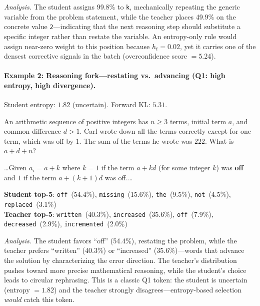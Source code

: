 \documentclass{article}
\begin{document}
\noindent\textit{Analysis.}
The student assigns 99.8\% to \texttt{k}, mechanically repeating the generic variable from the problem statement, while the teacher places 49.9\% on the concrete value \texttt{2}---indicating that the next reasoning step should substitute a specific integer rather than restate the variable.
An entropy-only rule would assign near-zero weight to this position because $h_t = 0.02$, yet it carries one of the densest corrective signals in the batch (overconfidence score $= 5.24$).

\paragraph{Example 2: Reasoning fork---restating vs.\ advancing (\textbf{Q1}: high entropy, high divergence).}
Student entropy: $1.82$ (uncertain). Forward KL: $5.31$.

\begin{tcolorbox}[colback=gray!5, colframe=black, boxrule=0.5pt, title={Problem}]
An arithmetic sequence of positive integers has $n \ge 3$ terms, initial term $a$, and common difference $d > 1$. Carl wrote down all the terms correctly except for one term, which was off by $1$. The sum of the terms he wrote was $222$. What is $a + d + n$?
\end{tcolorbox}

\begin{tcolorbox}[colback=blue!3, colframe=black, boxrule=0.5pt, title={Student response (excerpt)}]
\small
\ldots Given $a_i = a + k$ where $k = 1$ if the term $a + kd$ (for some integer $k$) was \colorbox{red!20}{\textbf{off}} and $1$ if the term $a + (k+1)d$ was off.\ldots
\end{tcolorbox}

\begin{tcolorbox}[colback=yellow!5, colframe=black, boxrule=0.5pt, title={Token distributions}]
\small
\textbf{Student top-5}: \texttt{off}~(54.4\%), \texttt{missing}~(15.6\%), \texttt{the}~(9.5\%), \texttt{not}~(4.5\%), \texttt{replaced}~(3.1\%) \\
\textbf{Teacher top-5}: \texttt{written}~(40.3\%), \texttt{increased}~(35.6\%), \texttt{off}~(7.9\%), \texttt{decreased}~(2.9\%), \texttt{incremented}~(2.0\%)
\end{tcolorbox}

\noindent\textit{Analysis.}
The student favors ``off'' (54.4\%), restating the problem, while the teacher prefers ``written'' (40.3\%) or ``increased'' (35.6\%)---words that advance the solution by characterizing the error direction.
The teacher's distribution pushes toward more precise mathematical reasoning, while the student's choice leads to circular rephrasing.
This is a classic Q1 token: the student is uncertain (entropy $= 1.82$) and the teacher strongly disagrees---entropy-based selection \emph{would} catch this token.
\end{document}
